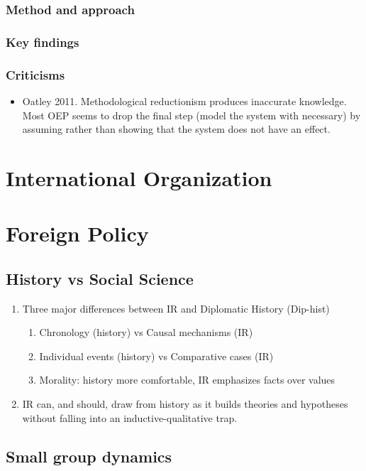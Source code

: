 \documentclass[11pt]{article}
\begin{document}
\subsubsection{Method and approach}
\label{sec-2-1-1}
\subsubsection{Key findings}
\label{sec-2-1-2}
\subsubsection{Criticisms}
\label{sec-2-1-3}
\begin{itemize}
\item Oatley 2011.
\label{sec-2-1-3-1}
Methodological reductionism produces inaccurate knowledge. Most OEP
seems to drop the final step (model the system with necessary) by
assuming rather than showing that the system does not have an effect.
\end{itemize}
\section{International Organization}
\label{sec-3}

\section{Foreign Policy}
\label{sec-4}
\subsection{History vs Social Science}
\label{sec-4-1}
\begin{enumerate}
\item Three major differences between IR and Diplomatic History (Dip-hist)
\begin{enumerate}
\item Chronology (history) vs Causal mechanisms (IR)
\item Individual events (history) vs Comparative cases (IR)
\item Morality: history more comfortable, IR emphasizes facts over values
\end{enumerate}
\item IR can, and should, draw from history as it builds theories and
hypotheses without falling into an inductive-qualitative trap.
\end{enumerate}
\subsection{Small group dynamics}
\label{sec-4-2}
\end{document}
